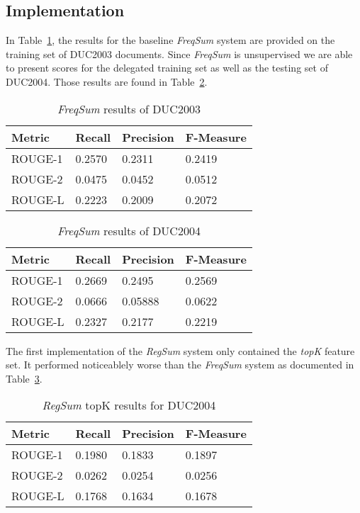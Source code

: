 \documentclass{article}
\begin{document}
\subsection{Implementation}

In Table~\ref{table:freqduc2003}, the results for the baseline \emph{FreqSum} system
are provided on the training set of DUC2003 documents. Since \emph{FreqSum} is
unsupervised we are able to present scores for the delegated training set as
well as the testing set of DUC2004. Those results are found in Table~\ref{table:freqduc2004}.

\begin{table}[h]
    \centering
    \begin{tabular}{llll}
        \hline
        Metric & Recall & Precision & F-Measure \\ \hline
        ROUGE-1 & 0.2570 & 0.2311 & 0.2419 \\ \hline
        ROUGE-2 & 0.0475 & 0.0452 & 0.0512 \\ \hline
        ROUGE-L & 0.2223 & 0.2009 &  0.2072 \\ \hline
    \end{tabular}
    \caption{\emph{FreqSum} results of DUC2003}
    \label{table:freqduc2003}
\end{table}

\begin{table}[h]
    \centering
    \begin{tabular}{llll}
        \hline
        Metric & Recall & Precision & F-Measure \\ \hline
        ROUGE-1 & 0.2669 & 0.2495 & 0.2569 \\ \hline
        ROUGE-2 & 0.0666 & 0.05888 & 0.0622 \\ \hline
        ROUGE-L & 0.2327 & 0.2177 &  0.2219 \\ \hline
    \end{tabular}
    \caption{\emph{FreqSum} results of DUC2004}
    \label{table:freqduc2004}
\end{table}

The first implementation of the \emph{RegSum} system only contained the
\emph{topK} feature set. It performed noticeablely worse than the \emph{FreqSum}
system as documented in Table~\ref{table:regsumduc2004}.

\begin{table}[h]
    \centering
    \begin{tabular}{llll}
        \hline
        Metric & Recall & Precision & F-Measure \\ \hline
        ROUGE-1 & 0.1980 & 0.1833 & 0.1897 \\ \hline
        ROUGE-2 & 0.0262 & 0.0254 & 0.0256 \\ \hline
        ROUGE-L & 0.1768 & 0.1634 & 0.1678  \\ \hline
    \end{tabular}
    \caption{\emph{RegSum} topK results for DUC2004}
    \label{table:regsumduc2004}
\end{table}
\end{document}
